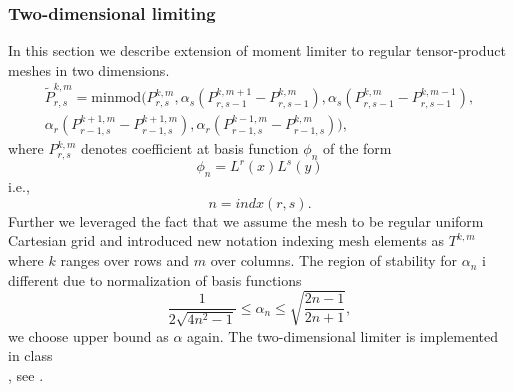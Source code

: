 \subsubsection{Two-dimensional limiting}
In this section we describe extension of moment limiter to regular tensor-product meshes 
in two dimensions.
\begin{multline}
\tilde{P}^{k,m}_{r,s} =
	\text{minmod}\big(P^{k,m}_{r,s}, 
					  \alpha_s(P^{k,m+1}_{r,s-1} - P^{k,m}_{r,s-1}),
					  \alpha_s(P^{k,m}_{r,s-1} - P^{k,m-1}_{r,s-1}),\\
					  \alpha_r(P^{k+1,m}_{r-1,s} - P^{k+1,m}_{r-1,s}),
					  \alpha_r(P^{k-1,m}_{r-1,s} - P^{k,m}_{r-1,s})\big),
\end{multline}
where $P^{k, m}_{r,s}$ denotes coefficient at basis function $\phi_n$ of the form
$$
\phi_n = L^r(x)L^s(y)
$$
i.e.,
$$
n = indx(r, s).
$$
Further we leveraged the fact that we assume the mesh to be regular uniform 
Cartesian grid and introduced new notation indexing mesh elements as $T^{k,m}$ where $k$ 
ranges over rows and $m$ over columns.
The region of stability for $\alpha_n$ i different due to normalization of basis functions
\begin{equation}
\frac{1}{2\sqrt{4n^2 - 1}} \leq \alpha_n \leq \sqrt{\frac{2n - 1}{2n + 1}},
\end{equation}
we choose upper bound as $\alpha$ again. The two-dimensional limiter is implemented in 
class\\ , see . 



